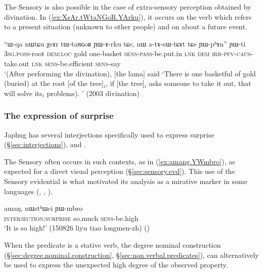 The Sensory is also possible in the case of extra-sensory perception obtained by divination. In (\ref{ex:XsAr.tWtaNGoR.YArku}), it occurs on the verb  which refers to a present situation (unknown to other people) and on  about a future event.
 
\begin{exe}
\ex \label{ex:XsAr.tWtaNGoR.YArku}
\gll ``ɯ-qa nɯtɕu χsɤr tɯ-taɴɢoʁ ɲɯ-ɤ-rku tɕe, nɯ a-tɤ-sɯ-tɕɤt tɕe ɲɯ-pʰɤn'' ɲɯ-ti \\
\textsc{3sg}.\textsc{poss}-root \textsc{dem}:\textsc{loc} gold one-basket \textsc{sens}-\textsc{pass}-be.put.in \textsc{lnk} \textsc{dem} \textsc{irr}-\textsc{pfv}-\textsc{caus}-take.out \textsc{lnk} \textsc{sens}-be.efficient \textsc{sens}-say \\
\glt `(After performing the divination), [the lama] said `There is one basketful of gold (buried) at the root [of the tree]$_i$, if [the tree]$_i$ asks someone to take it out, that will solve its$_i$ problems). ' (2003 divination)
\end{exe}

\subsubsection{The expression of surprise} \label{sec:mirative}
Japhug has several interjections specifically used to express surprise (§\ref{sec:interjections}),  and . 

The Sensory often occurs in such contexts, as in (\ref{ex:amang.YWmbro}), as expected for a direct visual perception (§\ref{sec:sensory.evd}). This use of the Sensory evidential is what motivated its analysis as a mirative marker in some languages (\citealt{hill12mirativity}, \citealt{delancey12still}, \citealt{aikhenvald12mirativity}).

\begin{exe}
\ex \label{ex:amang.YWmbro}
 \gll amaŋ, nɯstʰɯci ɲɯ-mbro \\
 \textsc{interjection}:\textsc{surprise} so.much \textsc{sens}-be.high \\
 \glt `It is so high!' (150826 liyu tiao longmen-zh) ()
\end{exe}

When the predicate is a stative verb, the degree nominal construction (§\ref{sec:degree.nominal.construction}, §\ref{sec:non.verbal.predicates}), can alternatively be used to express the unexpected high degree of the observed property.

